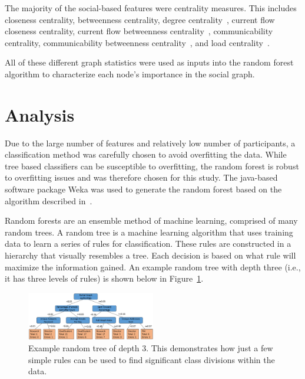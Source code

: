 \documentclass{article}
\begin{document}
The majority of the social-based features were centrality measures.  This includes closeness centrality, betweenness centrality, degree centrality~\cite{borgatti2011analyzing}, current flow closeness centrality, current flow betweenness centrality~\cite{brandes2005centrality}, communicability centrality, communicability betweenness centrality~\cite{estrada2008communicability}, and load centrality~\cite{newman2001scientific}.

All of these different graph statistics were used as inputs into the random forest algorithm to characterize each node's importance in the social graph.


\section{Analysis} \label{Analysis}

Due to the large number of features and relatively low number of participants, a classification method was carefully chosen to avoid overfitting the data.  While tree based classifiers can be susceptible to overfitting, the random forest is robust to overfitting issues and was therefore chosen for this study.  The java-based software package Weka was used to generate the random forest based on the algorithm described in~\cite{Breiman2001}.

Random forests are an ensemble method of machine learning, comprised of many random trees.  A random tree is a machine learning algorithm that uses training data to learn a series of rules for classification.  These rules are constructed in a hierarchy that visually resembles a tree.  Each decision is based on what rule will maximize the information gained.  An example random tree with depth three (i.e., it has three levels of rules) is shown below in Figure~\ref{fig:ex_tree}.
\begin{figure}[H]
    \centering
        \includegraphics[width=0.5\textwidth]{3_level_tree}
        \caption{Example random tree of depth 3.  This demonstrates how just a few simple rules can be used to find significant class divisions within the data.}
        \label{fig:ex_tree}
\end{figure}
\end{document}
